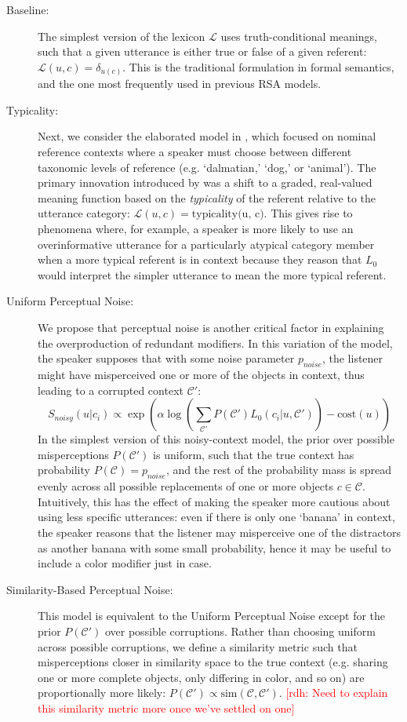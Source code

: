 \documentclass[10pt,letterpaper]{article}
\newcommand{\rdh}[1]{\textcolor{Red}{[rdh: #1]}}
\begin{document}
\begin{description}

\item[Baseline:] The simplest version of the lexicon $\mathcal{L}$ uses truth-conditional meanings, such that a given utterance is either true or false of a given referent: $\mathcal{L}(u,c) = \delta_{u(c)}$. This is the traditional formulation in formal semantics, and the one most frequently used in previous RSA models. 

\item[Typicality:] Next, we consider the elaborated model in , which focused on nominal reference contexts where a speaker must choose between different taxonomic levels of reference (e.g. `dalmatian,' `dog,' or `animal'). The primary innovation introduced by  was a shift to a graded, real-valued meaning function based on the \emph{typicality} of the referent relative to the utterance category: $\mathcal{L}(u,c) = \textrm{typicality(u, c)}$. This gives rise to phenomena where, for example, a speaker is more likely to use an overinformative utterance for a particularly atypical category member when a more typical referent is in context because they reason that $L_0$ would interpret the simpler utterance to mean the more typical referent. 

\item[Uniform Perceptual Noise:] We propose that perceptual noise is another critical factor in explaining the overproduction of redundant modifiers. In this variation of the model, the speaker supposes that with some noise parameter $p_{noise}$, the listener might have misperceived one or more of the objects in context, thus leading to a corrupted context $\mathcal{C}'$:
$$S_{noisy}(u|c_i) \propto \exp\left( \alpha\log\left(\sum_{\mathcal{C'}} P(\mathcal{C}')L_0(c_i | u, \mathcal{C}')\right) - \textrm{cost}(u)\right)$$
In the simplest version of this noisy-context model, the prior over possible misperceptions $P(\mathcal{C}')$ is uniform, such that the true context has probability $P(\mathcal{C}) = p_{noise}$, and the rest of the probability mass is spread evenly across all possible replacements of one or more objects $c \in \mathcal{C}$. Intuitively, this has the effect of making the speaker more cautious about using less specific utterances: even if there is only one `banana' in context, the speaker reasons that the listener may misperceive one of the distractors as another banana with some small probability, hence it may be useful to include a color modifier just in case.

\item[Similarity-Based Perceptual Noise:] This model is equivalent to the Uniform Perceptual Noise except for the prior $P(\mathcal{C'})$ over possible corruptions. Rather than choosing uniform across possible corruptions, we define a similarity metric such that misperceptions closer in similarity space to the true context (e.g. sharing one or more complete objects, only differing in color, and so on) are proportionally more likely: $P(\mathcal{C'}) \propto \textrm{sim}(\mathcal{C}, \mathcal{C'})$.
\rdh{Need to explain this similarity metric more once we've settled on one}
\end{description}
\end{document}
